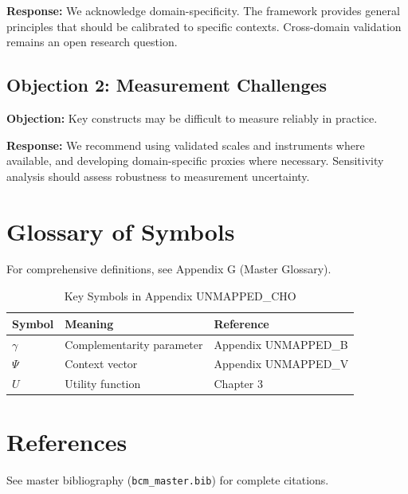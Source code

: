 \textbf{Response:} We acknowledge domain-specificity. The framework provides
general principles that should be calibrated to specific contexts. Cross-domain
validation remains an open research question.

\subsection{Objection 2: Measurement Challenges}

\textbf{Objection:} Key constructs may be difficult to measure reliably in
practice.

\textbf{Response:} We recommend using validated scales and instruments where
available, and developing domain-specific proxies where necessary. Sensitivity
analysis should assess robustness to measurement uncertainty.



\section{Glossary of Symbols}
\label{sec:cho-glossary}

For comprehensive definitions, see Appendix G (Master Glossary).

\begin{table}[htbp]
\centering
\caption{Key Symbols in Appendix UNMAPPED_CHO}
\begin{tabular}{lll}
\toprule
\textbf{Symbol} & \textbf{Meaning} & \textbf{Reference} \\
\midrule
$\gamma$ & Complementarity parameter & Appendix UNMAPPED_B \\
$\Psi$ & Context vector & Appendix UNMAPPED_V \\
$U$ & Utility function & Chapter 3 \\
\bottomrule
\end{tabular}
\end{table}


\section{References}
\label{sec:cho-references}

See master bibliography (\texttt{bcm\_master.bib}) for complete citations.

